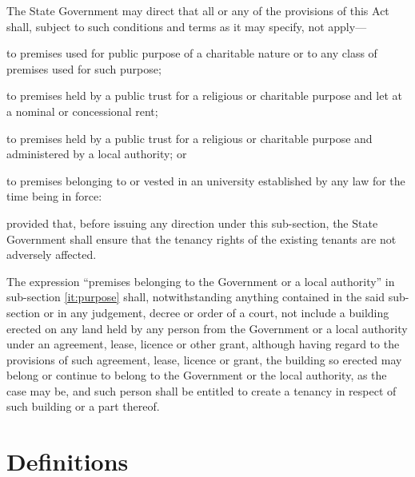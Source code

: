 \documentclass{mhact}
\begin{document}
\begin{subsectionlist}
\item The State Government may direct that all or any of the
  provisions of this Act shall, subject to such conditions and terms
  as it may specify, not apply---
  \begin{subclause}
  \item to premises used for public purpose of a charitable nature or to any
    class of premises used for such purpose;
  \item to premises held by a public trust for a religious or
    charitable purpose and let at a nominal or concessional rent;
  \item  to premises held by a public trust for a religious or
    charitable purpose and administered by a local authority; or
  \item to premises belonging to or vested in an university
    established by any law for the time being in force:
  \end{subclause}
  provided that, before issuing any direction under this sub-section,
  the State Government shall ensure that the tenancy rights of the
  existing tenants are not adversely affected.

\item The expression ``premises belonging to the Government or a local
  authority'' in sub-section \ref{it:purpose} shall, notwithstanding
  anything contained in the said sub-section or in any judgement,
  decree or order of a court, not include a building erected on any
  land held by any person from the Government or a local authority
  under an agreement, lease, licence or other grant, although having
  regard to the provisions of such agreement, lease, licence or grant,
  the building so erected may belong or continue to belong to the
  Government or the local authority, as the case may be, and such
  person shall be entitled to create a tenancy in respect of such
  building or a part thereof.
\end{subsectionlist}

\section{Definitions}
\label{sec:def}
\end{document}
